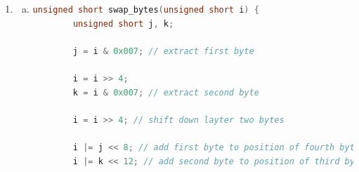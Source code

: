\documentclass[12pt]{article}
\begin{document}
\begin{enumerate}[1.]
\begin{itemize}
        \bigskip
    \end{itemize}

    \bigskip

    \underline{\textbf{Notes}}

    \begin{itemize}
        \item \texttt{0x0007} in binary is \texttt{0x0000000000001111}
        \item \texttt{c $>>$ 4} shifts \texttt{c} to right by 4 bits and return
        overlapping value between {c $>>$ 4} and \texttt{0x0000000000001111} (\texttt{0x007})
        \item Test code is below

\begin{lstlisting}[language=c]
    #include <stdio.h>
    #include <stdlib.h>

    #define MK_COLOR(r,g,b) (long) ( (r | (g << 8)) | (r | (b << 16)))
    #define GET_RED(c) (long) (c & 0x007)
    #define GET_GREEN(c) (long) ((c >> 8) & 0x007)
    #define GET_BLUE(c) (long) ((c >> 16) & 0x007)

    int main() {
        long i, r = 4, g = 5, b = 6, r2, g2, b2;

        i = MK_COLOR(r,g,b);

        r2 = GET_RED(i);
        g2 = GET_GREEN(i);
        b2 = GET_BLUE(i);

        printf("%ld\n", i);
        printf("%ld\n", r2);
        printf("%ld\n", g2);
        printf("%ld\n", b2);

        return 0;
    }
\end{lstlisting}
    \end{itemize}

    \item

    \begin{enumerate}[a)]

        \item

\begin{lstlisting}[language=c]
    unsigned short swap_bytes(unsigned short i) {
        unsigned short j, k;

        j = i & 0x007; // extract first byte

        i = i >> 4;
        k = i & 0x007; // extract second byte

        i = i >> 4; // shift down layter two bytes

        i |= j << 8; // add first byte to position of fourth byte
        i |= k << 12; // add second byte to position of third byte


\end{lstlisting}
\end{enumerate}
\end{enumerate}
\end{document}
